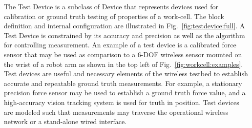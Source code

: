 \documentclass[journal, twoside]{IEEEtran}
\begin{document}
	The Test Device is a subclass of Device that represents devices used for calibration or ground truth testing of properties of a work-cell.  The block definition and internal configuration are illustrated in Fig.~\ref{fig:testdevice:full}.  A Test Device is constrained by its accuracy and precision as well as the algorithm for controlling measurement.  An example of a test device is a calibrated force sensor that may be used as comparison to a 6-DOF wireless sensor mounted on the wrist of a robot arm as shown in the top left of Fig.~\ref{fig:workcell:examples}. Test devices are useful and necessary elements of the wireless testbed to establish accurate and repeatable ground truth measurements.  For example, a stationary precision force sensor may be used to establish a ground truth force value, and a high-accuracy vision tracking system is used for truth in position.  Test devices are modeled such that measurements may traverse the operational wireless network or a stand-alone wired interface.
	
\end{document}
